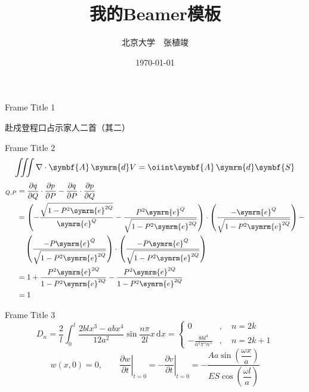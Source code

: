 \documentclass{beamer}
\title{我的Beamer模板}
\author{北京大学\ \ 张植竣}
\date{\today}
\begin{document}
\begin{frame}[plain]
    \maketitle
\end{frame}

\begin{frame}{Frame Title 1}
    \begin{center}
        赴戍登程口占示家人二首（其二）
        \medskip

        \bigskip

    \end{center}
\end{frame}

\begin{frame}{Frame Title 2}
    \[
    \iiint \nabla\cdot\symbf{A}\,\symrm{d}V = \oiint \symbf{A}\,\symrm{d}\symbf{S}
    \]
    \begin{align*}
        [q,p]_{Q,P}
        &= \frac{\partial q}{\partial Q}\cdot\frac{\partial p}{\partial P} - \frac{\partial q}{\partial P}\cdot\frac{\partial p}{\partial Q} \\
        &= \left(-\frac{\sqrt{1-P^2\symrm{e}^{2Q}}}{\symrm{e}^Q} - \frac{P^2\symrm{e}^Q}{\sqrt{1-P^2\symrm{e}^{2Q}}}\right)\cdot\left(\frac{-\symrm{e}^Q}{\sqrt{1-P^2\symrm{e}^{2Q}}}\right) - \\
        &\quad\left(\frac{-P\symrm{e}^Q}{\sqrt{1-P^2\symrm{e}^{2Q}}}\right)\cdot\left(\frac{-P\symrm{e}^Q}{\sqrt{1-P^2\symrm{e}^{2Q}}}\right) \\
        &= 1 + \frac{P^2\symrm{e}^{2Q}}{1-P^2\symrm{e}^{2Q}} - \frac{P^2\symrm{e}^{2Q}}{1-P^2\symrm{e}^{2Q}} \\
        &= 1
    \end{align*}
\end{frame}

\begin{frame}{Frame Title 3}
    \begin{equation}
    D_n = \frac{2}{l}\int_0^l\frac{2blx^3-abx^4}{12a^2}\sin\frac{n\pi}{2l}x \,\mathrm{d}x = \left\{
    \begin{aligned}
        0\qquad &,\quad n = 2k \\
        -\frac{8bl^4}{a^2 \pi^5 n^5}&,\quad n = 2k + 1
    \end{aligned}
    \right.
    \end{equation}
    \begin{equation}
    w(x,0) = 0,\qquad \left.\frac{\partial w}{\partial t}\right|_{t=0} = -\left.\frac{\partial v}{\partial t}\right|_{t=0} = -\frac{Aa\sin\left(\dfrac{\omega x}{a}\right)}{ES\cos\left(\dfrac{\omega l}{a}\right)}
    \end{equation}
\end{frame}
\end{document}
